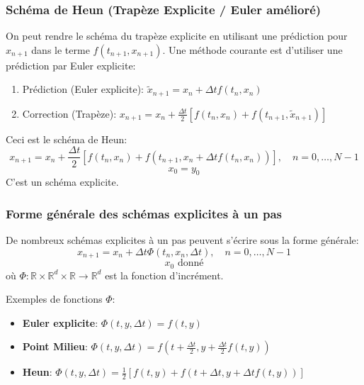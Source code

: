\subsubsection{Schéma de Heun (Trapèze Explicite / Euler amélioré)}
\label{sssec:heun}
On peut rendre le schéma du trapèze explicite en utilisant une prédiction pour $x_{n+1}$ dans le terme $f(t_{n+1}, x_{n+1})$.
Une méthode courante est d'utiliser une prédiction par Euler explicite:
\begin{enumerate}
    \item Prédiction (Euler explicite): $\tilde{x}_{n+1} = x_n + \Delta t f(t_n, x_n)$
    \item Correction (Trapèze): $x_{n+1} = x_n + \frac{\Delta t}{2} [f(t_n, x_n) + f(t_{n+1}, \tilde{x}_{n+1})]$
\end{enumerate}
Ceci est le schéma de Heun:
\[ x_{n+1} = x_n + \frac{\Delta t}{2} \left[ f(t_n, x_n) + f(t_{n+1}, x_n + \Delta t f(t_n, x_n)) \right], \quad n=0, \dots, N-1 \]
\[ x_0 = y_0 \]
C'est un schéma explicite.

\subsubsection{Forme générale des schémas explicites à un pas}
\label{sssec:forme_generale_explicite}
De nombreux schémas explicites à un pas peuvent s'écrire sous la forme générale:
\[ x_{n+1} = x_n + \Delta t \Phi(t_n, x_n, \Delta t), \quad n=0, \dots, N-1 \]
\[ x_0 \text{ donné} \]
où $\Phi: \mathbb{R} \times \mathbb{R}^d \times \mathbb{R} \to \mathbb{R}^d$ est la fonction d'incrément.
\begin{example} Exemples de fonctions $\Phi$:
\begin{itemize}
    \item \textbf{Euler explicite}: $\Phi(t, y, \Delta t) = f(t, y)$
    \item \textbf{Point Milieu}: $\Phi(t, y, \Delta t) = f\left(t + \frac{\Delta t}{2}, y + \frac{\Delta t}{2} f(t, y)\right)$
    \item \textbf{Heun}: $\Phi(t, y, \Delta t) = \frac{1}{2} \left[ f(t, y) + f(t + \Delta t, y + \Delta t f(t, y)) \right]$
\end{itemize}
\end{example}

